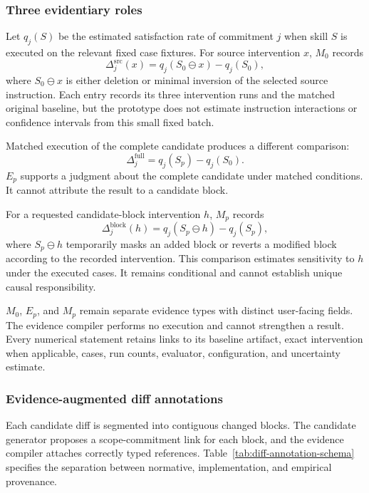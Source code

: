 \subsubsection{Three evidentiary roles}
Let $q_j(S)$ be the estimated satisfaction rate of commitment $j$ when skill $S$ is executed on the relevant fixed case fixtures. For source intervention $x$, $M_0$ records
\[
\Delta^{\mathrm{src}}_j(x)=q_j(S_0\ominus x)-q_j(S_0),
\]
where $S_0\ominus x$ is either deletion or minimal inversion of the selected source instruction. Each entry records its three intervention runs and the matched original baseline, but the prototype does not estimate instruction interactions or confidence intervals from this small fixed batch.

Matched execution of the complete candidate produces a different comparison:
\[
\Delta^{\mathrm{full}}_j=q_j(S_p)-q_j(S_0).
\]
$E_p$ supports a judgment about the complete candidate under matched conditions. It cannot attribute the result to a candidate block.

For a requested candidate-block intervention $h$, $M_p$ records
\[
\Delta^{\mathrm{block}}_j(h)=q_j(S_p\ominus h)-q_j(S_p),
\]
where $S_p\ominus h$ temporarily masks an added block or reverts a modified block according to the recorded intervention. This comparison estimates sensitivity to $h$ under the executed cases. It remains conditional and cannot establish unique causal responsibility.

$M_0$, $E_p$, and $M_p$ remain separate evidence types with distinct user-facing fields. The evidence compiler performs no execution and cannot strengthen a result. Every numerical statement retains links to its baseline artifact, exact intervention when applicable, cases, run counts, evaluator, configuration, and uncertainty estimate.

\subsubsection{Evidence-augmented diff annotations}
Each candidate diff is segmented into contiguous changed blocks. The candidate generator proposes a scope-commitment link for each block, and the evidence compiler attaches correctly typed references. Table~\ref{tab:diff-annotation-schema} specifies the separation between normative, implementation, and empirical provenance.

